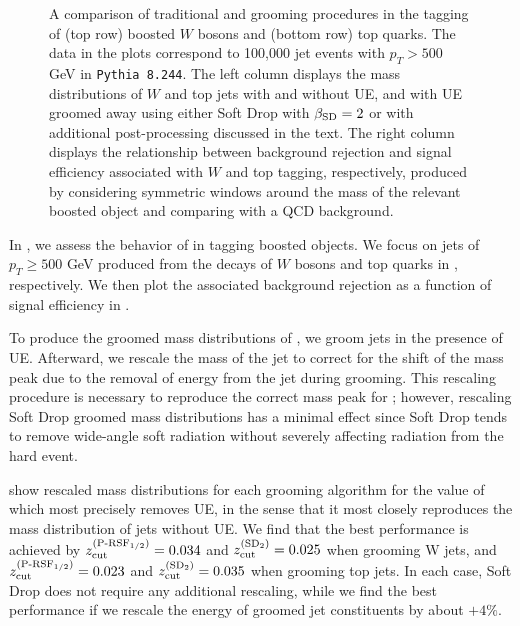 \begin{figure}[p]
{\label{fig:top_tagging_roc}
}
\caption{
     A comparison of traditional and \PIRANHA{} grooming procedures in the tagging of (top row) boosted \(W\) bosons and (bottom row) top quarks.
      The data in the plots correspond to 100,000 jet events with \(p_T > 500\) GeV in \texttt{Pythia 8.244}.
      The left column displays the mass distributions of \(W\) and top jets with and without UE, and with UE groomed away using either Soft Drop with \(\beta_{\rm SD} = 2\) or  with additional post-processing discussed in the text.
      The right column displays the relationship between background rejection and signal efficiency associated with \(W\) and top tagging, respectively, produced by considering symmetric windows around the mass of the relevant boosted object and comparing with a QCD background.
      }
\label{fig:tagging}
\end{figure}

   In , we assess the behavior of \PIRANHA{} in tagging boosted objects.
   We focus on jets of \(p_T \geq 500\) GeV produced from the decays of \(W\) bosons and top quarks in , respectively.
   We then plot the associated background rejection as a function of signal efficiency in .

To produce the groomed mass distributions of , we groom jets in the presence of UE.
%
 Afterward, we rescale the mass of the jet to correct for the shift of the mass peak due to the removal of energy from the jet during grooming.
   This rescaling procedure is necessary to reproduce the correct mass peak for ;
   however, rescaling Soft Drop groomed mass distributions has a minimal effect since Soft Drop tends to remove wide-angle soft radiation without severely affecting radiation from the hard event.

    show rescaled mass distributions for each grooming algorithm for the value of \zcut{} which most precisely removes UE, in the sense that it most closely reproduces the mass distribution of jets without UE.
   We find that the best performance is achieved by \(z_{\rm cut}^{(\text{P-RSF}_{1/2})}=0.034\) and \(z_{\rm cut}^{(\text{SD}_2)}=0.025\) when grooming W jets, and \(z_{\rm cut}^{(\text{P-RSF}_{1/2})}=0.023\) and \(z_{\rm cut}^{(\text{SD}_2)}=0.035\) when grooming top jets.
   In each case, Soft Drop does not require any additional rescaling, while we find the best performance if we rescale the energy of  groomed jet constituents by about \(+4\%\).

